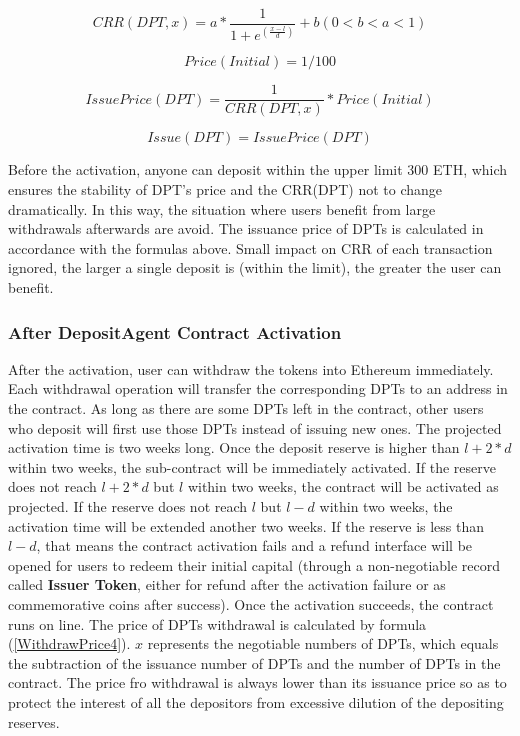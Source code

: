 \documentclass[a4paper, 10pt, conference]{ieeeconf} %
\begin{document}
\begin{equation}\label{CRR1}
{CRR(DPT, x) = a * \frac{1}{1+e^(\frac{x - l}{d})} + b (0 < b < a < 1)}
\end{equation}

\begin{equation}\label{Price2}
{Price(Initial) = 1/100}
\end{equation}

\begin{equation}\label{IssuePrice3}
{IssuePrice(DPT) = \frac{1}{CRR(DPT, x)} * Price(Initial)}
\end{equation}

\begin{equation}\label{Issue6}
{Issue(DPT) = IssuePrice(DPT)}
\end{equation}

Before the activation, anyone can deposit within the upper limit 300 ETH, which ensures the stability of DPT's price and the CRR(DPT) not to change dramatically. In this way, the situation where users benefit from large withdrawals afterwards are avoid. The issuance price of DPTs is calculated in accordance with the formulas above. Small impact on CRR of each transaction ignored, the larger a single deposit is (within the limit), the greater the user can benefit.

\subsubsection{After DepositAgent Contract Activation}

After the activation, user can withdraw the tokens into Ethereum immediately. Each withdrawal operation will transfer the corresponding DPTs to an address in the contract. As long as there are some DPTs left in the contract, other users who deposit will first use those DPTs instead of issuing new ones. 
The projected activation time is two weeks long. Once the deposit reserve is higher than ${l + 2 * d}$ within two weeks, the sub-contract will be immediately activated. If the reserve does not reach ${l + 2 * d}$ but $l$ within two weeks, the contract will be activated as projected. If the reserve does not reach $l$ but ${l - d}$ within two weeks, the activation time will be extended another two weeks. If the reserve is less than ${l - d}$, that means the contract activation fails and a refund interface will be opened for users to redeem their initial capital (through a non-negotiable record called \textbf{Issuer Token}, either for refund after the activation failure or as commemorative coins after success).
Once the activation succeeds, the contract runs on line. The price of DPTs withdrawal is calculated by formula (\ref{WithdrawPrice4}). $x$ represents the negotiable numbers of DPTs, which equals the subtraction of the issuance number of DPTs and the number of DPTs in the contract. The price fro withdrawal is always lower than its issuance price so as to protect the interest of all the depositors from excessive dilution of the depositing reserves.
\end{document}
